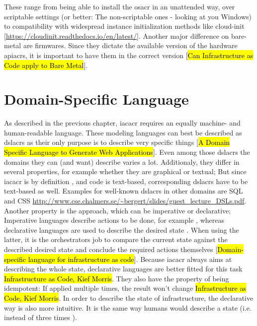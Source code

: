 These range from being able to install the \gls{osacr} in an unattended way, over scriptable settings (or better: The non-scriptable ones - looking at you Windows) to compatibility with widespread instance initialization methods like cloud-init [\url{https://cloudinit.readthedocs.io/en/latest/}].
\newline
Another major difference on bare-metal are firmwares. Since they dictate the available version of the hardware \gls{apiacr}s, it is important to have them in the correct version [\hl{Can Infrastructure as Code apply to Bare Metal}].



\section{Domain-Specific Language} %
As described in the previous chapter, \gls{iacacr} requires an equally machine- and human-readable language. These modeling languages can best be described as \gls{dslacr}s as their only purpose is to describe very specific things [\hl{A Domain Specific Language to Generate Web Applications}]. Even among those \gls{dslacr}s the domains they can (and want) describe varies a lot. Additionaly, they differ in several properties, for example whether they are graphical or textual; But since \gls{iacacr} is by definition , and code is text-based, corresponding \gls{dslacr}s have to be text-based as well. Examples for well-known \gls{dslacr}s in other domains are SQL and CSS \url{http://www.cse.chalmers.se/~bergert/slides/guest_lecture_DSLs.pdf}.
Another property is the approach, which can be imperative or declarative; Imperative languages describe actions to be done, for example , whereas declarative languages are used to describe the desired state . When using the latter, it is the orchestrators job to compare the current state against the described desired state and conclude the required actions themselves [\hl{Domain-specific language for infrastructure as code}].
Because \gls{iacacr} always aims at describing the whole state, declarative languages are better fitted for this task \hl{Infrastructure as Code, Kief Morris}. They also have the property of being idempotent: If applied multiple times, the result won't change \hl{Infrastructure as Code, Kief Morris}. In order to describe the state of infrastructure, the declarative way is also more intuitive. It is the same way humans would describe a state (i.e.  instead of three times ).
